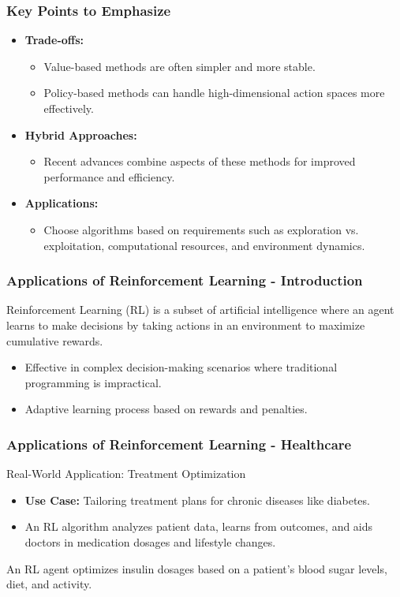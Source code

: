 \documentclass[aspectratio=169]{beamer}
\begin{document}
\begin{frame}[fragile]
    \frametitle{Key Points to Emphasize}
    \begin{itemize}
        \item \textbf{Trade-offs:}
        \begin{itemize}
            \item Value-based methods are often simpler and more stable.
            \item Policy-based methods can handle high-dimensional action spaces more effectively.
        \end{itemize}
        \item \textbf{Hybrid Approaches:}
        \begin{itemize}
            \item Recent advances combine aspects of these methods for improved performance and efficiency.
        \end{itemize}
        \item \textbf{Applications:}
        \begin{itemize}
            \item Choose algorithms based on requirements such as exploration vs. exploitation, computational resources, and environment dynamics.
        \end{itemize}
    \end{itemize}
\end{frame}

\begin{frame}[fragile]
    \frametitle{Applications of Reinforcement Learning - Introduction}
    Reinforcement Learning (RL) is a subset of artificial intelligence where an agent learns to make decisions by taking actions in an environment to maximize cumulative rewards. 
    \begin{itemize}
        \item Effective in complex decision-making scenarios where traditional programming is impractical.
        \item Adaptive learning process based on rewards and penalties.
    \end{itemize}
\end{frame}

\begin{frame}[fragile]
    \frametitle{Applications of Reinforcement Learning - Healthcare}
    \begin{block}{Real-World Application: Treatment Optimization}
        \begin{itemize}
            \item \textbf{Use Case:} Tailoring treatment plans for chronic diseases like diabetes.
            \item An RL algorithm analyzes patient data, learns from outcomes, and aids doctors in medication dosages and lifestyle changes.
        \end{itemize}
    \end{block}
    \begin{example}
        An RL agent optimizes insulin dosages based on a patient’s blood sugar levels, diet, and activity.
    \end{example}
\end{frame}
\end{document}
